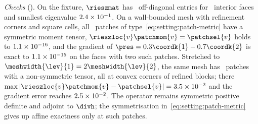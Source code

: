 \emph{Checks} (). On the fixture, $\rieszmat$ has
\chkMetricOffdiag\ off-diagonal entries for \chkMetricFaces\ interior faces and
smallest eigenvalue $2.4\times10^{-1}$. On a wall-bounded mesh with refinement
corners and square cells, all \chkSquarePatches\ patches of
type~\cref{eq:setting:patch-metric} have a symmetric moment tensor,
$\rieszloc{v}\patchmom{v}=\patchsel{v}$ holds to $1.1\times10^{-16}$, and
the gradient of $\pres=0.3\coordk{1}-0.7\coordk{2}$ is exact to
$1.1\times10^{-15}$ on the faces with two such patches. Stretched to
$\meshwidth{\lev}{1}=2\meshwidth{\lev}{2}$, the same mesh has
\chkStretchedAsymmetric\ patches with a non-symmetric tensor, all at
convex corners of refined blocks; there
$\max\abs{\rieszloc{v}\patchmom{v}-\patchsel{v}}=\chkStretchedResidualAsym$
and the gradient error reaches $2.5\times10^{-2}$. The operator
remains symmetric positive definite and adjoint to $\divh$; the
symmetrisation in~\cref{eq:setting:patch-metric} gives up affine exactness
only at such patches.

